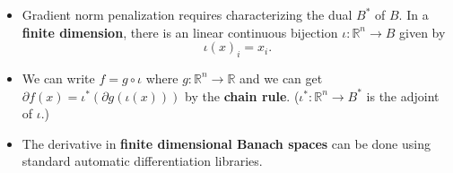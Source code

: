\documentclass[landscape,headrule,footrule]{foils}
\begin{document}
\begin{frame}
\begin{flushleft}
\begin{itemize}
\item Gradient norm penalization requires characterizing the dual $B^*$ of $B$. In a \textbf{finite dimension}, there is an linear continuous bijection $\iota: \mathbb{R}^n \rightarrow B$ given by
\begin{equation}
\iota(x)_i = x_i.
\end{equation}
\item We can write $f = g\circ \iota$  where $g: \mathbb{R}^n \rightarrow \mathbb{R}$ and we can get  $ \partial f(x) = \iota^* (\partial g(\iota(x)))$ by the \textbf{chain rule}.
($\iota^* :\mathbb{R}^n \rightarrow B^*$ is the adjoint of $\iota$.) \\
\item The derivative in \textbf{finite dimensional Banach spaces} can be done using standard automatic differentiation libraries. \\

\end{itemize}
\end{flushleft}
\end{frame}

\end{document}
